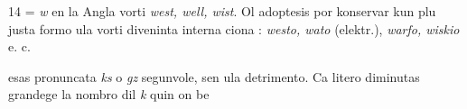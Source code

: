 \begin{VUpage}[18]{14}
\VUblancAlinea
{} = \textit{w} en la Angla vorti \textit{west, well, wist}. Ol adoptesis por\nl
konservar kun plu justa formo ula vorti diveninta interna\cc
ciona : \textit{westo, wato} (elektr.), \textit{warfo, wiskio} e. c.

\VUblancAlinea
{} esas pronuncata \textit{ks} o \textit{gz} segunvole, sen ula detrimento.\nl
Ca litero diminutas grandege la nombro dil \textit{k} quin on be\cc
\end{VUpage}

